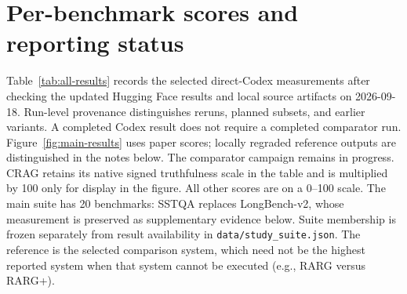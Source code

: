 \section{Per-benchmark scores and reporting status}
\label{app:result-details}
Table~\ref{tab:all-results} records the selected direct-Codex measurements after checking
the updated Hugging Face results and local source artifacts on
2026-09-18. Run-level provenance distinguishes reruns, planned subsets, and earlier
variants. A completed Codex result does not require a completed comparator run.
Figure~\ref{fig:main-results} uses paper scores; locally regraded reference outputs are
distinguished in the notes below. The comparator campaign remains in progress.
CRAG retains its native signed truthfulness scale in the table and is multiplied by 100
only for display in the figure. All other scores are on a 0--100 scale.
The main suite has 20 benchmarks: SSTQA replaces LongBench-v2, whose measurement is
preserved as supplementary evidence below. Suite membership is frozen separately from
result availability in \texttt{data/study\_suite.json}.
The reference is the selected comparison system, which need not be the highest reported
system when that system cannot be executed (e.g., RARG versus RARG+).

